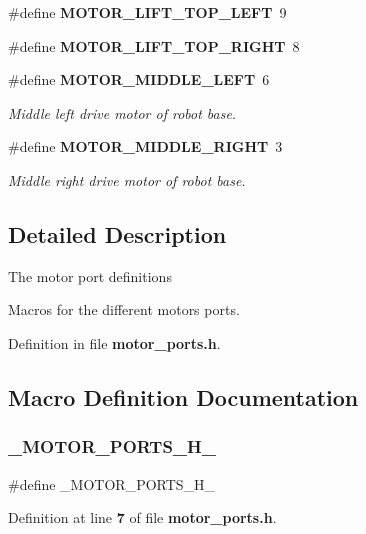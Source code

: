 \begin{DoxyCompactItemize}
\#define \textbf{ M\+O\+T\+O\+R\+\_\+\+L\+I\+F\+T\+\_\+\+T\+O\+P\+\_\+\+L\+E\+FT}~9
\item 
\#define \textbf{ M\+O\+T\+O\+R\+\_\+\+L\+I\+F\+T\+\_\+\+T\+O\+P\+\_\+\+R\+I\+G\+HT}~8
\item 
\#define \textbf{ M\+O\+T\+O\+R\+\_\+\+M\+I\+D\+D\+L\+E\+\_\+\+L\+E\+FT}~6
\begin{DoxyCompactList}\small\item\em Middle left drive motor of robot base. \end{DoxyCompactList}\item 
\#define \textbf{ M\+O\+T\+O\+R\+\_\+\+M\+I\+D\+D\+L\+E\+\_\+\+R\+I\+G\+HT}~3
\begin{DoxyCompactList}\small\item\em Middle right drive motor of robot base. \end{DoxyCompactList}\end{DoxyCompactItemize}


\subsection{Detailed Description}
The motor port definitions

Macros for the different motors ports. 



Definition in file \textbf{ motor\+\_\+ports.\+h}.



\subsection{Macro Definition Documentation}
\mbox{\label{motor__ports_8h_a96b0e64c39730b0c4ca0d9e493bc0f58}} 
\subsubsection{\+\_\+\+M\+O\+T\+O\+R\+\_\+\+P\+O\+R\+T\+S\+\_\+\+H\+\_\+}
{\footnotesize\ttfamily \#define \+\_\+\+M\+O\+T\+O\+R\+\_\+\+P\+O\+R\+T\+S\+\_\+\+H\+\_\+}



Definition at line \textbf{ 7} of file \textbf{ motor\+\_\+ports.\+h}.

